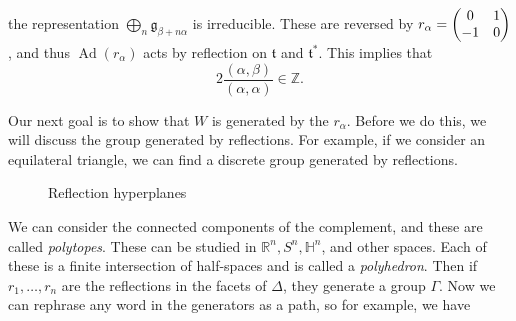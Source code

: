 \documentclass[leqno, openany]{memoir}
\theoremstyle{definition}
\theoremstyle{remark}
\theoremstyle{plain}
\theoremstyle{definition}
\theoremstyle{remark}
\newcommand{\R}{\mathbb{R}}
\newcommand{\Z}{\mathbb{Z}}
\newcommand{\h}{\mathfrak{h}}
\newcommand{\mf}[1]{\mathfrak{#1}}
\DeclareMathOperator{\Ad}{Ad}
\begin{document}
the representation $\bigoplus_n \mf{g}_{\beta + n \alpha}$ is irreducible. These are reversed by $r_{\alpha} = \mqty(0 & 1 \\ - 1 & 0)$, and thus $\Ad(r_{\alpha})$ acts by reflection on $\mf{t}$ and $\mf{t}^*$. This implies that
\[ 2 \frac{(\alpha, \beta)}{(\alpha, \alpha)} \in \Z. \]

Our next goal is to show that $W$ is generated by the $r_{\alpha}$. Before we do this, we will discuss the group generated by reflections. For example, if we consider an equilateral triangle, we can find a discrete group generated by reflections.
\begin{figure}[H]
    \centering
    \caption{Reflection hyperplanes}%
    \label{fig:reflection}
\end{figure}
We can consider the connected components of the complement, and these are called \textit{polytopes}. These can be studied in $\R^n, S^n, \mathbb{H}^n$, and other spaces. Each of these is a finite intersection of half-spaces and is called a \textit{polyhedron}. Then if $r_1, \ldots, r_n$ are the reflections in the facets of $\Delta$, they generate a group $\Gamma$. Now we can rephrase any word in the generators as a path, so for example, we have
\end{document}
